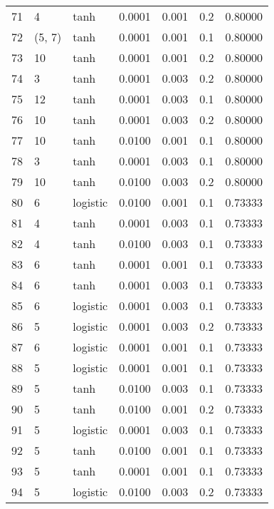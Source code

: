 \begin{tabular}{lllrrrr}
71  &           4 &      tanh &  0.0001 &  0.001 &  0.2 &   0.80000 \\
72  &      (5, 7) &      tanh &  0.0001 &  0.001 &  0.1 &   0.80000 \\
73  &          10 &      tanh &  0.0001 &  0.001 &  0.2 &   0.80000 \\
74  &           3 &      tanh &  0.0001 &  0.003 &  0.2 &   0.80000 \\
75  &          12 &      tanh &  0.0001 &  0.003 &  0.1 &   0.80000 \\
76  &          10 &      tanh &  0.0001 &  0.003 &  0.2 &   0.80000 \\
77  &          10 &      tanh &  0.0100 &  0.001 &  0.1 &   0.80000 \\
78  &           3 &      tanh &  0.0001 &  0.003 &  0.1 &   0.80000 \\
79  &          10 &      tanh &  0.0100 &  0.003 &  0.2 &   0.80000 \\
80  &           6 &  logistic &  0.0100 &  0.001 &  0.1 &   0.73333 \\
81  &           4 &      tanh &  0.0001 &  0.003 &  0.1 &   0.73333 \\
82  &           4 &      tanh &  0.0100 &  0.003 &  0.1 &   0.73333 \\
83  &           6 &      tanh &  0.0001 &  0.001 &  0.1 &   0.73333 \\
84  &           6 &      tanh &  0.0001 &  0.003 &  0.1 &   0.73333 \\
85  &           6 &  logistic &  0.0001 &  0.003 &  0.1 &   0.73333 \\
86  &           5 &  logistic &  0.0001 &  0.003 &  0.2 &   0.73333 \\
87  &           6 &  logistic &  0.0001 &  0.001 &  0.1 &   0.73333 \\
88  &           5 &  logistic &  0.0001 &  0.001 &  0.1 &   0.73333 \\
89  &           5 &      tanh &  0.0100 &  0.003 &  0.1 &   0.73333 \\
90  &           5 &      tanh &  0.0100 &  0.001 &  0.2 &   0.73333 \\
91  &           5 &  logistic &  0.0001 &  0.003 &  0.1 &   0.73333 \\
92  &           5 &      tanh &  0.0100 &  0.001 &  0.1 &   0.73333 \\
93  &           5 &      tanh &  0.0001 &  0.001 &  0.1 &   0.73333 \\
94  &           5 &  logistic &  0.0100 &  0.003 &  0.2 &   0.73333 \\

\end{tabular}
